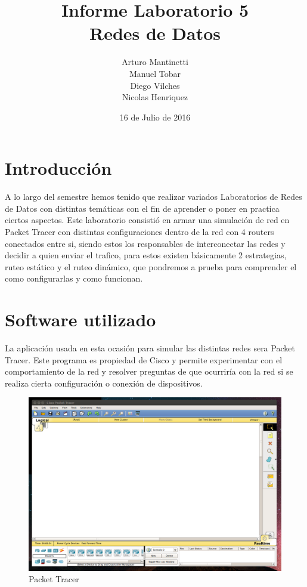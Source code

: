 \documentclass[spanish]{udpreport}
\title{Informe Laboratorio 5 \\ Redes de Datos}
\author{Arturo Mantinetti \\ Manuel Tobar \\ Diego Vilches \\ Nicolas Henriquez}
\date{16 de Julio de 2016}
\begin{document}
\maketitle

\tableofcontents

\chapter{Introducción}

A lo largo del semestre hemos tenido que realizar variados Laboratorios de Redes de Datos con distintas temáticas con el fin de aprender o poner en practica ciertos aspectos.
Este laboratorio consistió en armar una simulación de red en Packet Tracer con distintas configuraciones dentro de la red con 4 routers conectados entre si, siendo estos los responsables de interconectar las redes y decidir a quien enviar el trafico, para estos existen básicamente 2 estrategias, ruteo estático y el ruteo dinámico, que pondremos a prueba para comprender el como configurarlas y como funcionan.

\chapter{Software utilizado}
La aplicación usada en esta ocasión para simular las distintas redes sera Packet Tracer. Este programa es propiedad de Cisco y permite experimentar con el comportamiento de la red y resolver preguntas de que ocurriría con la red si se realiza cierta configuración o conexión de dispositivos.

\begin{figure}[H]
	\centering
	\includegraphics[scale=.25]{imagenes/A0e.png}
	\caption{Packet Tracer}
	\label{fig:Figura 1.1}
\end{figure}
\end{document}

